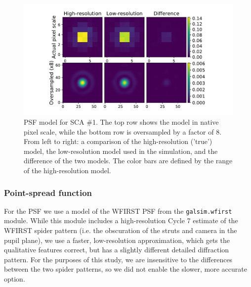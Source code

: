 \documentclass[aps,prd, amsmath,amssymb,superscriptaddress,showkeys,nofootinbib,reprint,preprintnumbers]{revtex4-1}
\begin{document}
\begin{figure}
\begin{center}
\includegraphics[width=\columnwidth]{figures/psf.pdf}
\end{center}
\caption[]{
PSF model for SCA \#1. The top row shows the model in native pixel scale, while the bottom row is oversampled by a factor of 8. From left to right: a comparison of the high-resolution ('true') model, the low-resolution model used in the simulation, and the difference of the two models. The color bars are defined by the range of the high-resolution model.
\label{fig:psf}}
\end{figure}

\subsubsection{Point-spread function}\label{psf}

For the PSF we use a model of the WFIRST PSF from the \texttt{galsim.wfirst} module.
While this module includes a high-resolution Cycle 7 estimate of the WFIRST spider pattern (i.e. the obscuration of the struts and camera in the pupil plane), we use a faster, low-resolution approximation, which gets the qualitative features correct, but has a slightly different detailed diffraction pattern.  
For the purposes of this study, we are insensitive to the differences between the two spider patterns, so we did not enable the slower, more accurate option.
\end{document}
